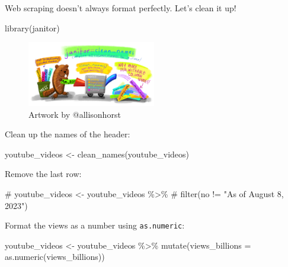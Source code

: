 \documentclass[
  letterpaper,
  DIV=11,
  numbers=noendperiod]{scrartcl}
\newenvironment{Shaded}{\begin{snugshade}}{\end{snugshade}}
\newcommand{\AttributeTok}[1]{\textcolor[rgb]{0.40,0.45,0.13}{#1}}
\newcommand{\CommentTok}[1]{\textcolor[rgb]{0.37,0.37,0.37}{#1}}
\newcommand{\FunctionTok}[1]{\textcolor[rgb]{0.28,0.35,0.67}{#1}}
\newcommand{\NormalTok}[1]{\textcolor[rgb]{0.00,0.23,0.31}{#1}}
\newcommand{\OtherTok}[1]{\textcolor[rgb]{0.00,0.23,0.31}{#1}}
\newcommand{\SpecialCharTok}[1]{\textcolor[rgb]{0.37,0.37,0.37}{#1}}
\begin{document}
Web scraping doesn't always format perfectly. Let's clean it up!

\begin{Shaded}
\begin{Highlighting}[]
\FunctionTok{library}\NormalTok{(janitor)}
\end{Highlighting}
\end{Shaded}

\begin{figure}

{\centering \includegraphics[width=0.5\textwidth,height=\textheight]{118_N_webscraping_tables_files/mediabag/79a12c01-0cc1-4643-b.png}

}

\caption{Artwork by @allisonhorst}

\end{figure}

Clean up the names of the header:

\begin{Shaded}
\begin{Highlighting}[]
\NormalTok{youtube\_videos }\OtherTok{\textless{}{-}} \FunctionTok{clean\_names}\NormalTok{(youtube\_videos)}
\end{Highlighting}
\end{Shaded}

Remove the last row:

\begin{Shaded}
\begin{Highlighting}[]
\CommentTok{\# youtube\_videos \textless{}{-} youtube\_videos \%\textgreater{}\% }
\CommentTok{\#   filter(no != "As of August 8, 2023")}
\end{Highlighting}
\end{Shaded}

Format the views as a number using \texttt{as.numeric}:

\begin{Shaded}
\begin{Highlighting}[]
\NormalTok{youtube\_videos }\OtherTok{\textless{}{-}}\NormalTok{ youtube\_videos }\SpecialCharTok{\%\textgreater{}\%} 
  \FunctionTok{mutate}\NormalTok{(}\AttributeTok{views\_billions =} \FunctionTok{as.numeric}\NormalTok{(views\_billions))}
\end{Highlighting}
\end{Shaded}
\end{document}
